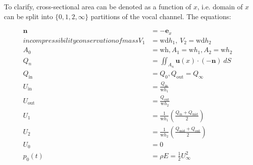 \documentclass{article}
\begin{document}
To clarify, cross-sectional area can be denoted as a function of $x$,
i.e. domain of $x$ can be split into $\{0,1,2,\infty\}$ partitions of the vocal channel.
The equations:

\begin{align}
    \mathbf{n} &= -\mathbf{e}_x \tag{normal vector everywhere} \\
    incompressibility
    conservation of mass
    V_1 &= \mathrm{wd}h_1,~ V_2 = \mathrm{wd}h_2 \tag{volume dimensions} \\
    A_0 &= \mathrm{wh},  A_1 = \mathrm{w}h_1, A_2 = \mathrm{w}h_2 \tag{cross-sectional areas} \\
    Q_n &= \iint_{A_n}\mathbf{u}(x)\cdot (-\mathbf{n})~dS \tag{everywhere flux per unit mass} \\
    Q_\mathrm{in} &= Q_0, Q_\mathrm{out} = Q_\infty \tag{flux in consistent regions} \\
    U_\mathrm{in} &= \frac{Q_\mathrm{in}}{\mathrm{w}h_1} \\
    U_\mathrm{out} &= \frac{Q_\mathrm{out}}{\mathrm{w}h_2} \tag{velocity on the boundaries} \\
    U_1 &= \frac{1}{\mathrm{w}h_1}\left(\frac{Q_\mathrm{in} + Q_\mathrm{mid}}{2}\right) \\
    U_2 &= \frac{1}{\mathrm{w}h_2}\left(\frac{Q_\mathrm{mid} + Q_\mathrm{out}}{2}\right) \tag{interpolated velocity from flux}\\
    U_0 &= 0 \tag{force velocity local to lung} \\
    p_0(t) &= \rho E = \frac{1}{2}U_\infty^2 \tag{consequence of assumptions and atmospheric pressure}
\end{align}
\end{document}

